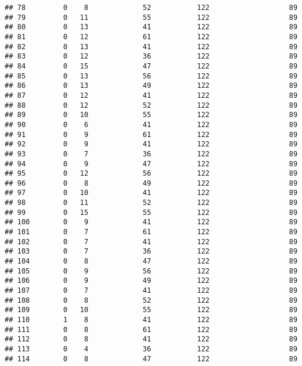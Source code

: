 \documentclass[]{article}
\begin{document}
\begin{verbatim}
## 78         0    8             52           122                   89
## 79         0   11             55           122                   89
## 80         0   13             41           122                   89
## 81         0   12             61           122                   89
## 82         0   13             41           122                   89
## 83         0   12             36           122                   89
## 84         0   15             47           122                   89
## 85         0   13             56           122                   89
## 86         0   13             49           122                   89
## 87         0   12             41           122                   89
## 88         0   12             52           122                   89
## 89         0   10             55           122                   89
## 90         0    6             41           122                   89
## 91         0    9             61           122                   89
## 92         0    9             41           122                   89
## 93         0    7             36           122                   89
## 94         0    9             47           122                   89
## 95         0   12             56           122                   89
## 96         0    8             49           122                   89
## 97         0   10             41           122                   89
## 98         0   11             52           122                   89
## 99         0   15             55           122                   89
## 100        0    9             41           122                   89
## 101        0    7             61           122                   89
## 102        0    7             41           122                   89
## 103        0    7             36           122                   89
## 104        0    8             47           122                   89
## 105        0    9             56           122                   89
## 106        0    9             49           122                   89
## 107        0    7             41           122                   89
## 108        0    8             52           122                   89
## 109        0   10             55           122                   89
## 110        1    8             41           122                   89
## 111        0    8             61           122                   89
## 112        0    8             41           122                   89
## 113        0    4             36           122                   89
## 114        0    8             47           122                   89

\end{verbatim}
\end{document}
